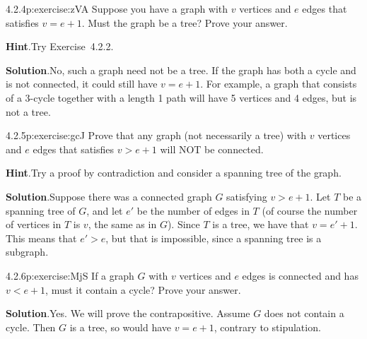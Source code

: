\documentclass[twoside,11pt,]{book}
\newcommand{\blocktitlefont}{\relax}
\numberwithin{equation}{chapter}
\newcommand{\lt}{<}
\newcommand{\gt}{>}
\begin{document}
\begin{divisionsolution}{4.2.4}{}{p:exercise:zVA}%
Suppose you have a graph with \(v\) vertices and \(e\) edges that satisfies \(v = e+1\). Must the graph be a tree? Prove your answer.%
\par\smallskip%
\noindent\textbf{\blocktitlefont Hint}.\quad{}Try Exercise~4.2.2.%
\par\smallskip%
\noindent\textbf{\blocktitlefont Solution}.\quad{}No, such a graph need not be a tree. If the graph has both a cycle and is not connected, it could still have \(v=e+1\). For example, a graph that consists of a 3-cycle together with a length 1 path will have 5 vertices and 4 edges, but is not a tree.%
\end{divisionsolution}%
\begin{divisionsolution}{4.2.5}{}{p:exercise:gcJ}%
Prove that any graph (not necessarily a tree) with \(v\) vertices and \(e\) edges that satisfies \(v \gt e+1\) will NOT be connected.%
\par\smallskip%
\noindent\textbf{\blocktitlefont Hint}.\quad{}Try a proof by contradiction and consider a spanning tree of the graph.%
\par\smallskip%
\noindent\textbf{\blocktitlefont Solution}.\quad{}Suppose there was a connected graph \(G\) satisfying \(v \gt e+1\). Let \(T\) be a spanning tree of \(G\), and let \(e'\) be the number of edges in \(T\) (of course the number of vertices in \(T\) is \(v\), the same as in \(G\)). Since \(T\) is a tree, we have that \(v = e'+1\). This means that \(e' \gt e\), but that is impossible, since a spanning tree is a subgraph.%
\end{divisionsolution}%
\begin{divisionsolution}{4.2.6}{}{p:exercise:MjS}%
If a graph \(G\) with \(v\) vertices and \(e\) edges is connected and has \(v \lt e+1\), must it contain a cycle? Prove your answer.%
\par\smallskip%
\noindent\textbf{\blocktitlefont Solution}.\quad{}Yes. We will prove the contrapositive. Assume \(G\) does not contain a cycle. Then \(G\) is a tree, so would have \(v = e+1\), contrary to stipulation.%
\end{divisionsolution}%
\end{document}
